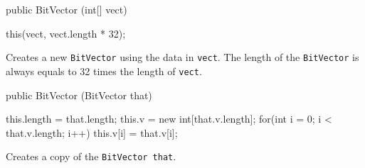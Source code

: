 \begin{code}

   public BitVector (int[] vect) \begin{hide} {
      this(vect, vect.length * 32);
   } \end{hide}
\end{code}
\begin{tabb} Creates a new \texttt{BitVector} using the data in \texttt{vect}.
  The length of the \texttt{BitVector} is always equals to 32 times the 
  length of \texttt{vect}.
\end{tabb}
\begin{htmlonly}
\end{htmlonly}
\begin{code}

   public BitVector (BitVector that) \begin{hide} {
      this.length = that.length;
      this.v = new int[that.v.length];
      for(int i = 0; i < that.v.length; i++)
         this.v[i] = that.v[i];
   } \end{hide}
\end{code}
\begin{tabb} Creates a copy of the \texttt{BitVector that}.
\end{tabb}
\begin{htmlonly}
\end{htmlonly}

